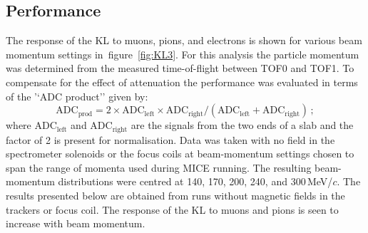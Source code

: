 \subsection{Performance}
\label{SubSect:KL_Performance}
The response of the KL to muons, pions, and electrons is shown for
various beam momentum settings in~figure~\ref{fig:KL3}.
For this analysis the particle momentum was determined from the
measured time-of-flight between TOF0 and TOF1.
To compensate for the effect of attenuation the performance was
evaluated in terms of the '`ADC product'' given by:
\begin{equation}
  \text{ADC}_{\text{prod}} = 2 \times
    \text{ADC}_{\text{left}} \times \text{ADC}_{\text{right}} /
    (\text{ADC}_{\text{left}} + \text{ADC}_{\text{right}})\,;
\end{equation}
where ADC$_{\text{left}}$ and ADC$_{\text{right}}$ are the signals
from the two ends of a slab and the factor of 2 is present for
normalisation.
Data was taken with no field in the spectrometer solenoids or the
focus coils at beam-momentum settings chosen to span the range of
momenta used during MICE running.
The resulting beam-momentum distributions were centred at 140, 170,
200, 240, and 300\,MeV/$c$.
The results presented below are obtained from runs without magnetic
fields in the trackers or focus coil.
The response of the KL to muons and pions is seen to increase with
beam momentum.
